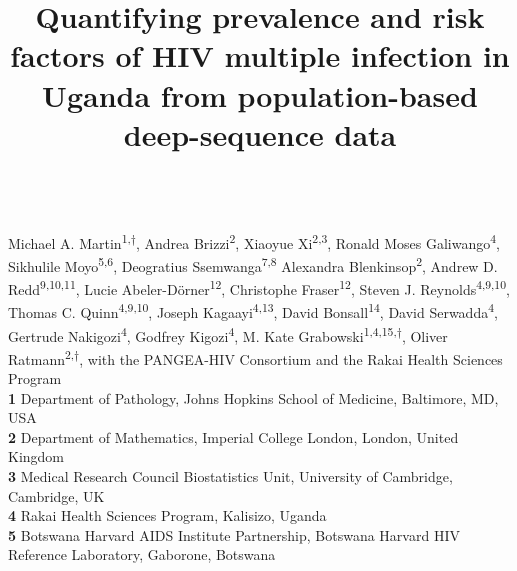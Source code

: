 \documentclass[10pt,letterpaper]{article}
\title{Quantifying prevalence and risk factors of HIV multiple infection in Uganda from population-based deep-sequence data}
\begin{document}

\begin{flushleft}

{\Large\textbf{} 
%
%
}
\newline
\\
Michael A. Martin\textsuperscript{1,$\dagger$},
Andrea Brizzi\textsuperscript{2},
Xiaoyue Xi\textsuperscript{2,3},
Ronald Moses Galiwango\textsuperscript{4},
Sikhulile Moyo\textsuperscript{5,6},
Deogratius Ssemwanga\textsuperscript{7,8}
Alexandra Blenkinsop\textsuperscript{2},
Andrew D. Redd\textsuperscript{9,10,11},
Lucie Abeler-Dörner\textsuperscript{12},
Christophe Fraser\textsuperscript{12},
Steven J. Reynolds\textsuperscript{4,9,10},
Thomas C. Quinn\textsuperscript{4,9,10},
Joseph Kagaayi\textsuperscript{4,13},
David Bonsall\textsuperscript{14},
David Serwadda\textsuperscript{4},
Gertrude Nakigozi\textsuperscript{4},
Godfrey Kigozi\textsuperscript{4},
M. Kate Grabowski\textsuperscript{1,4,15,$\dagger$},
Oliver Ratmann\textsuperscript{2,$\dagger$},
with the PANGEA-HIV Consortium and the Rakai Health Sciences Program
\\
\bigskip
\textbf{1} Department of Pathology, Johns Hopkins School of Medicine, Baltimore, MD, USA
\\
\textbf{2} Department of Mathematics, Imperial College London, London, United Kingdom
\\
\textbf{3} Medical Research Council Biostatistics Unit, University of Cambridge, Cambridge, UK \\

\textbf{4} Rakai Health Sciences Program, Kalisizo, Uganda \\

\textbf{5} Botswana Harvard AIDS Institute Partnership, Botswana Harvard HIV Reference Laboratory, Gaborone, Botswana \\


\end{flushleft}
\end{document}
